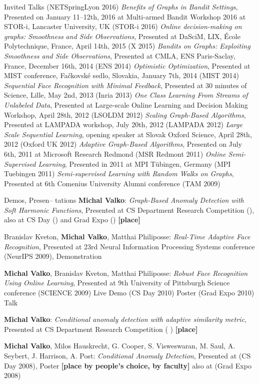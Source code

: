 \documentclass{resume}
\begin{document}
\begin{category}{Invited Talks}
({\sf NETSpringLyon 2016})
\citembullet
\emph{Benefits of Graphs in Bandit Settings}, Presented on January 11--12th, 2016 at Multi-armed Bandit Workshop 2016 at STOR-i, Lancaster University, UK 
({\sf STOR-i 2016})
\citembullet
\emph{Online decision-making on graphs: Smoothness and Side Observations},
 Presented  at DaSciM, LIX, \'Ecole Polytechnique, France, April 14th, 2015 
({\sf X 2015})
\citembullet
\emph{Bandits on Graphs: Exploiting Smoothness and Side Observations},
 Presented  at CMLA, ENS Paris-Saclay, France, December 16th, 2014 
({\sf ENS 2014})
\citembullet
  \emph{Optimistic Optimization},
 Presented  at MIST conference, Fa\v ckovsk\' e sedlo, Slovakia, January 7th, 2014
({\sf MIST 2014})
\citembullet
\emph{Sequential Face Recognition with Minimal Feedback},
Presented at 30 minutes of Science, Lille, May 2nd, 2013 ({\sf Inria 2013})
\citembullet
 \emph{One Class Learning From Streams of Unlabeled Data},
Presented at Large-scale Online Learning and Decision Making Workshop,
April 28th, 2012 ({\sf LSOLDM 2012})
\citembullet
 \emph{Scaling Graph-Based Algorithms}, Presented at
LAMPADA workshop, July 20th, 2012 ({\sf LAMPADA 2012})
\citembullet
\emph{Large Scale Sequential Learning}, opening speaker at
Slovak Oxford Science, April 28th, 2012 ({\sf Oxford UK 2012})
\citembullet
 \emph{Adaptive Graph-Based Algorithms}, Presented on July
6th, 2011 at Microsoft Research Redmond ({\sf MSR Redmont 2011})
\citembullet
 \emph{Online Semi-Supervised Learning}, Presented in 2011
at MPI T\"{u}bingen, Germany ({\sf MPI Tuebingen 2011})
\citembullet
 \emph{Semi-supervised Learning with Random Walks on
Graphs}, Presented at 6th Comenius University Alumni conference ({\sf TAM 2009})
\end{category}

\begin{category}{Demos, Presen-- tations}
\citembullet
{\bf Michal Valko}:  \emph{Graph-Based Anomaly Detection with Soft Harmonic
Functions}, Presented at
CS Department Research Competition  ({}), also at CS Day ({})
and  Grad Expo ({}) {\bf [\first place]}

\citembullet
Branislav Kveton, {\bf  Michal Valko}, Matthai Philiposse:  \emph{Real-Time
Adaptive Face Recognition}, Presented at
23rd Neural Information Processing Systems conference ({\sf NeurIPS 2009}),
Demonstration

\citembullet
{\bf  Michal Valko}, Branislav Kveton, Matthai Philiposse:  \emph{Robust Face
Recognition Using Online Learning}, Presented at
9th University of Pittsburgh Science conference ({\sf SCIENCE 2009}) Live Demo
({\sf CS Day 2010}) Poster ({\sf Grad Expo 2010}) Talk

\citembullet
{\bf Michal Valko}:  \emph{Conditional anomaly detection with adaptive
similarity metric}, Presented at
CS Department Research Competition  ({ }) {\bf [\first place]}

\citembullet
{\bf Michal Valko}, Milos Hauskrecht, G. Cooper, S. Visweswaran, M. Saul, A.
Seybert,  J. Harrison, A. Post:
\emph{Conditional Anomaly Detection}, Presented at ({\sf CS Day 2008}), Poster
 {\bf[\first  place by people's choice, \second by faculty]} also at ({\sf Grad
Expo 2008})
 \end{category}
\end{document}
